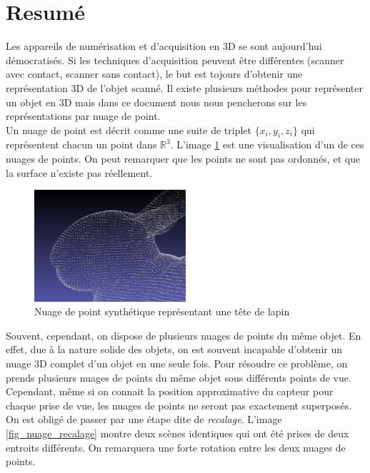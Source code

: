 \section{Resumé}

Les appareils de numérisation et d'acquisition en 3D se sont aujourd'hui démocratisés. Si les techniques d'acquisition peuvent être différentes (scanner avec contact, scanner sans contact), le but est tojours d'obtenir une représentation 3D de l'objet scanné. Il existe plusieurs méthodes pour représenter un objet en 3D mais dans ce document nous nous pencherons sur les représentations par nuage de point.\\

Un nuage de point est décrit comme une suite de triplet $\{x_{i},y_{i},z_{i}\}$ qui représentent chacun un point dans $\mathbb{R}^3$. L'image \ref{fig_nuage_bunny} est une visualisation d'un de ces nuages de points. On peut remarquer que les points ne sont pas ordonnés, et que la surface n'existe pas réellement. 

\begin{figure}[H]
\centering
\includegraphics[width = 0.5\textwidth]{Images/Resume/nuage_bunny}
\caption{Nuage de point synthétique représentant une tête de lapin}
\label{fig_nuage_bunny}
\end{figure}

Souvent, cependant, on dispose de plusieurs nuages de points du même objet. En effet, due à la nature solide des objets, on est souvent incapable d'obtenir un nuage 3D complet d'un objet en une seule fois. Pour résoudre ce problème, on prends plusieurs nuages de points du même objet sous différents points de vue. Cependant, même si on connait la position approximative du capteur pour chaque prise de vue, les nuages de points ne seront pas exactement superposés. On est obligé de passer par une étape dite de \textit{recalage}. L'image \ref{fig_nuage_recalage} montre deux scènes identiques qui ont été prises de deux entroits différents. On remarquera une forte rotation entre les deux nuages de points.

